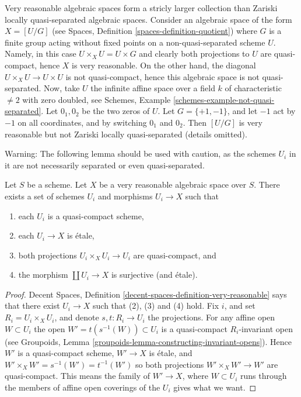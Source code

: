 \begin{remark}
\label{remark-very-reasonable-Zariski-locally-quasi-separated}
Very reasonable algebraic spaces form a stricly larger collection than
Zariski locally quasi-separated algebraic spaces. Consider
an algebraic space of the form $X = [U/G]$ (see
Spaces, Definition \ref{spaces-definition-quotient})
where $G$ is a finite group acting without fixed points on a
non-quasi-separated scheme $U$. Namely, in this case
$U \times_X U = U \times G$ and clearly both projections to $U$ are
quasi-compact, hence $X$ is very reasonable. On the other hand, the diagonal
$U \times_X U \to U \times U$ is not quasi-compact, hence this
algebraic space is not quasi-separated. Now, take $U$ the infinite
affine space over a field $k$ of characteristic $\not = 2$ with
zero doubled, see
Schemes, Example \ref{schemes-example-not-quasi-separated}.
Let $0_1, 0_2$ be the two zeros of $U$. Let $G = \{+1, -1\}$, and
let $-1$ act by $-1$ on all coordinates, and by switching
$0_1$ and $0_2$. Then $[U/G]$ is very reasonable but not Zariski locally
quasi-separated (details omitted).
\end{remark}

\noindent
Warning: The following lemma should be used with caution, as the schemes
$U_i$ in it are not necessarily separated or even quasi-separated.

\begin{lemma}
\label{lemma-very-reasonable-quasi-compact-pieces}
Let $S$ be a scheme.
Let $X$ be a very reasonable algebraic space over $S$.
There exists a set of schemes
$U_i$ and morphisms $U_i \to X$ such that
\begin{enumerate}
\item each $U_i$ is a quasi-compact scheme,
\item each $U_i \to X$ is \'etale,
\item both projections $U_i \times_X U_i \to U_i$ are quasi-compact, and
\item the morphism $\coprod U_i \to X$ is surjective (and \'etale).
\end{enumerate}
\end{lemma}

\begin{proof}
Decent Spaces, Definition \ref{decent-spaces-definition-very-reasonable}
says that there exist $U_i \to X$ such that (2), (3) and (4) hold.
Fix $i$, and set $R_i = U_i \times_X U_i$, and denote $s, t : R_i \to U_i$
the projections.
For any affine open $W \subset U_i$ the open $W' = t(s^{-1}(W)) \subset U_i$
is a quasi-compact $R_i$-invariant open (see
Groupoids, Lemma \ref{groupoids-lemma-constructing-invariant-opens}).
Hence $W'$ is a quasi-compact scheme, $W' \to X$ is \'etale, and
$W' \times_X W' = s^{-1}(W') = t^{-1}(W')$ so both projections
$W' \times_X W' \to W'$ are quasi-compact. This means the family of
$W' \to X$, where $W \subset U_i$ runs through the members of affine
open coverings of the $U_i$ gives what we want.
\end{proof}



















